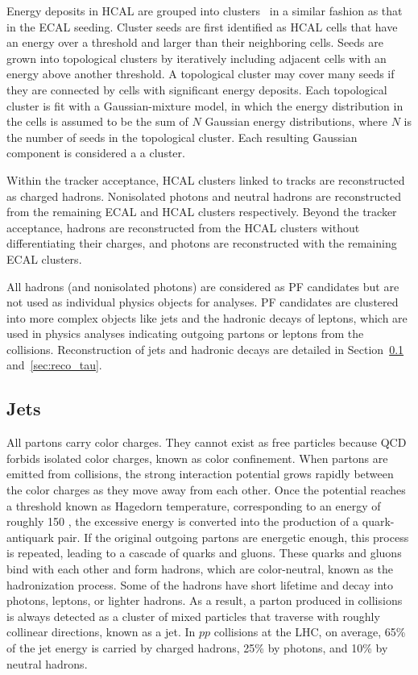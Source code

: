 Energy deposits in HCAL are grouped into clusters~\cite{Sirunyan_2017} in a similar fashion as that in the ECAL seeding.
Cluster seeds are first identified as HCAL cells that have an energy over a threshold and larger than their neighboring cells.
Seeds are grown into topological clusters by iteratively including adjacent cells with an energy above another threshold.
A topological cluster may cover many seeds if they are connected by cells with significant energy deposits.
Each topological cluster is fit with a Gaussian-mixture model, in which the energy distribution in the cells is assumed to be 
the sum of $N$ Gaussian energy distributions, where $N$ is the number of seeds in the topological cluster.
Each resulting Gaussian component is considered a a cluster.

Within the tracker acceptance, HCAL clusters linked to tracks are reconstructed as charged hadrons. 
Nonisolated photons and neutral hadrons are reconstructed from the remaining ECAL and HCAL clusters respectively.
Beyond the tracker acceptance, hadrons are reconstructed from the HCAL clusters without differentiating their charges,
and photons are reconstructed with the remaining ECAL clusters.

All hadrons (and nonisolated photons) are considered as PF candidates but are not used as individual physics objects for analyses.
PF candidates are clustered into more complex objects like jets and the hadronic decays of \tau{} leptons,
which are used in physics analyses indicating outgoing partons or \tau{} leptons from the collisions.  
Reconstruction of jets and hadronic \tau{} decays are detailed in Section~\ref{sec:reco_jet} and~\ref{sec:reco_tau}.


\subsection{Jets}\label{sec:reco_jet}

All partons carry color charges. 
They cannot exist as free particles because QCD forbids isolated color charges, known as color confinement.
When partons are emitted from collisions, the strong interaction potential grows rapidly between the color charges as they move away from each other.
Once the potential reaches a threshold known as Hagedorn temperature, corresponding to an energy of roughly 150 \MeV,
the excessive energy is converted into the production of a quark-antiquark pair. 
If the original outgoing partons are energetic enough, this process is repeated, leading to a cascade of quarks and gluons.
These quarks and gluons bind with each other and form hadrons, which are color-neutral, known as the hadronization process.
Some of the hadrons have short lifetime and decay into photons, leptons, or lighter hadrons.
As a result, a parton produced in collisions is always detected as a cluster of mixed particles that traverse with roughly collinear directions, known as a jet.
In $pp$ collisions at the LHC, on average, 65\% of the jet energy is carried by charged hadrons, 25\% by photons, and 10\% by neutral hadrons.

